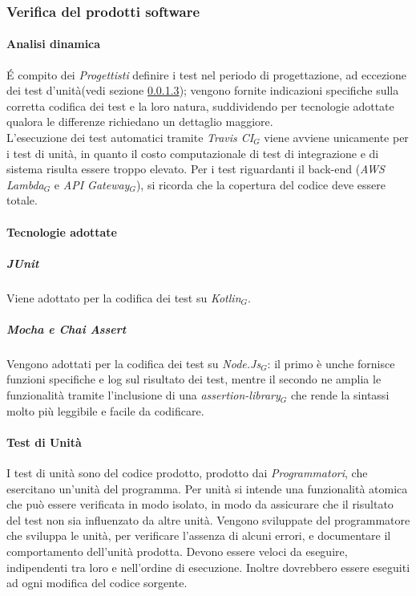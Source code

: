 \subsubsection{Verifica del prodotti software}
\paragraph{Analisi dinamica}\label{anDinamica}
\'E compito dei \textit{Progettisti} definire i test nel periodo di progettazione, ad eccezione dei test d'unità(vedi sezione \ref{tunita}); vengono fornite indicazioni specifiche sulla corretta codifica dei test e la loro natura, suddividendo per tecnologie adottate qualora le differenze richiedano un dettaglio maggiore.\\
L'esecuzione dei test automatici tramite \textit{Travis CI$_{G}$} viene avviene unicamente per i test di unità, in quanto il costo computazionale di test di integrazione e di sistema risulta essere troppo elevato.
Per i test riguardanti il back-end (\textit{AWS Lambda$_{G}$} e \textit{API Gateway$_{G}$}), si ricorda che la copertura del codice deve essere totale.
\paragraph{Tecnologie adottate}
\subparagraph{JUnit} Viene adottato per la codifica dei test su \textit{Kotlin$_{G}$}.
\subparagraph{Mocha e Chai Assert} Vengono adottati per la codifica dei test su \textit{Node.Js$_{G}$}: il primo è unche fornisce funzioni specifiche e log sul risultato dei test, mentre il secondo ne amplia le funzionalità tramite l'inclusione di una \textit{assertion-library$_{G}$} che rende la sintassi molto più leggibile e facile da codificare.

\paragraph{Test di Unità}\label{tunita}
I test di unità sono del codice prodotto, prodotto dai \textit{Programmatori}, che esercitano un'unità del programma. Per unità si intende una funzionalità atomica che può essere verificata in modo isolato, in modo da assicurare che il risultato del test non sia influenzato da altre unità. 
Vengono sviluppate del programmatore che sviluppa le unità, per verificare l'assenza di alcuni errori, e documentare il comportamento dell'unità prodotta. 
Devono essere veloci da eseguire, indipendenti tra loro e nell'ordine di esecuzione. Inoltre dovrebbero essere eseguiti ad ogni modifica del codice sorgente.
